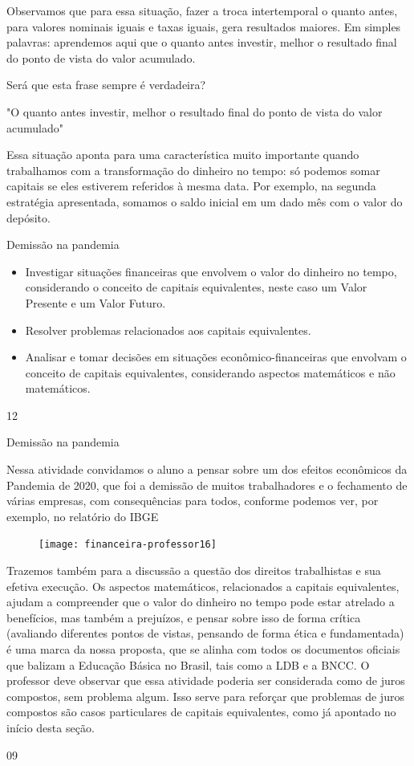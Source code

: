 Observamos que para essa situação, fazer a troca intertemporal o quanto antes, para valores nominais iguais e taxas iguais, gera resultados maiores. Em simples palavras: aprendemos aqui que o quanto antes investir, melhor o resultado final do ponto de vista do valor acumulado.

\begin{reflection}
Será que esta frase sempre é verdadeira?

"O quanto antes investir, melhor o resultado final do ponto de vista do valor acumulado"
\end{reflection}


Essa situação aponta para uma característica muito importante quando trabalhamos com a transformação do dinheiro no tempo: só podemos somar capitais se eles estiverem referidos à mesma data. Por exemplo, na segunda estratégia apresentada, somamos o saldo inicial em um dado mês com o valor do depósito.
\clearpage
\def\currentcolor{session2}
\begin{objectives}{Demissão na pandemia}
{
\begin{itemize}
\item Investigar situações financeiras que envolvem o valor do dinheiro no tempo, considerando o conceito de capitais equivalentes, neste caso um Valor Presente e um Valor Futuro. 
\item Resolver problemas relacionados aos capitais equivalentes.
\item Analisar e tomar decisões em situações econômico-financeiras que envolvam o conceito de capitais equivalentes, considerando aspectos matemáticos e não matemáticos.
\end{itemize}
}{1}{2}
\end{objectives}
\begin{sugestions}{Demissão na pandemia}
{
Nessa atividade convidamos o aluno a pensar sobre um dos efeitos econômicos da Pandemia de 2020, que foi a demissão de muitos trabalhadores e o fechamento de várias empresas, com consequências para todos, conforme podemos ver, por exemplo, no relatório do IBGE 
 
\begin{figure}[H]
\centering

\texttt{[image: financeira-professor16]}
\end{figure}

Trazemos também para a discussão a questão dos direitos trabalhistas e sua efetiva execução. Os aspectos matemáticos, relacionados a capitais equivalentes, ajudam a compreender que o valor do dinheiro no tempo pode estar atrelado a benefícios, mas também a prejuízos, e pensar sobre isso de forma crítica (avaliando diferentes pontos de vistas, pensando de forma ética e fundamentada) é uma marca da nossa proposta, que se alinha com todos os documentos oficiais que balizam a Educação Básica no Brasil, tais como a LDB e a BNCC.
O professor deve observar que essa atividade poderia ser considerada como de juros compostos, sem problema algum. Isso serve para reforçar que problemas de juros compostos são casos particulares de capitais equivalentes, como já apontado no início desta seção.

}{0}{9}
\end{sugestions}

